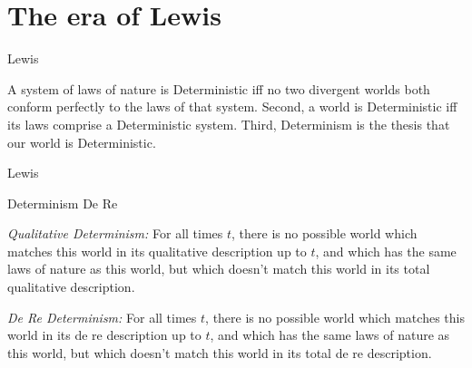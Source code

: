 \documentclass[fleqn]{beamer}
\begin{document}
\section{The era of Lewis}

\begin{frame}{Lewis}

  A system of laws of nature is Deterministic iff no two divergent
  worlds both conform perfectly to the laws of that system. Second, a
  world is Deterministic iff its laws comprise a Deterministic
  system. Third, Determinism is the thesis that our world is
  Deterministic. \citep[p 360]{lewis-work}


\end{frame}

\begin{frame}{Lewis}



\end{frame}


\begin{frame}{Determinism De Re}

  \emph{Qualitative Determinism:} For all times $t$, there is no
  possible world which matches this world in its qualitative
  description up to $t$, and which has the same laws of nature as this
  world, but which doesn't match this world in its total qualitative
  description. \citep[239]{hawthorne}

  \bigskip \emph{De Re Determinism:} For all times $t$, there is no
  possible world which matches this world in its de re description up
  to $t$, and which has the same laws of nature as this world, but
  which doesn't match this world in its total de re
  description. \citep[239]{hawthorne}


\end{frame}
\end{document}
